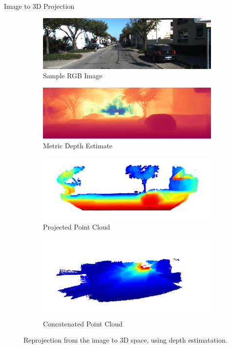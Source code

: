 \begin{frame}{Image to 3D Projection}
\begin{figure}
    \centering
    \begin{subfigure}[t]{0.49\textwidth}
        \centering
        \includegraphics[width=\textwidth]{figures/rgb_image.png}
        \caption{Sample RGB Image}
    \end{subfigure}
    \begin{subfigure}[t]{0.49\textwidth}
        \centering
        \includegraphics[width=\textwidth]{figures/depth_estimate.png}
        \caption{Metric Depth Estimate}
    \end{subfigure}
    \begin{subfigure}[t]{0.49\textwidth}
        \centering
        \includegraphics[width=\textwidth]{figures/projected_point_cloud.png}
        \caption{Projected Point Cloud}
    \end{subfigure}
    \begin{subfigure}[t]{0.49\textwidth}
        \centering
        \includegraphics[width=\textwidth]{figures/concatenated_point_cloud.png}
        \caption{Concatenated Point Cloud}
    \end{subfigure}
    \caption{Reprojection from the image to 3D space, using depth estimatation.}
\end{figure}
\end{frame}

